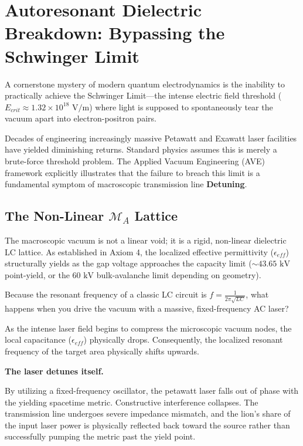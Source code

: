\chapter{Autoresonant Dielectric Breakdown: Bypassing the Schwinger Limit}
\label{ch:schwinger_autoresonance}

A cornerstone mystery of modern quantum electrodynamics is the inability to practically achieve the Schwinger Limit---the intense electric field threshold ($E_{crit} \approx 1.32 \times 10^{18} \text{ V/m}$) where light is supposed to spontaneously tear the vacuum apart into electron-positron pairs. 

Decades of engineering increasingly massive Petawatt and Exawatt laser facilities have yielded diminishing returns. Standard physics assumes this is merely a brute-force threshold problem. The Applied Vacuum Engineering (AVE) framework explicitly illustrates that the failure to breach this limit is a fundamental symptom of macroscopic transmission line \textbf{Detuning}.

\section{The Non-Linear $\mathcal{M}_A$ Lattice}
The macroscopic vacuum is not a linear void; it is a rigid, non-linear dielectric LC lattice. As established in Axiom 4, the localized effective permittivity ($\epsilon_{eff}$) structurally yields as the gap voltage approaches the capacity limit ($\sim 43.65 \text{ kV}$ point-yield, or the $60 \text{ kV}$ bulk-avalanche limit depending on geometry).

Because the resonant frequency of a classic LC circuit is $f = \frac{1}{2\pi\sqrt{LC}}$, what happens when you drive the vacuum with a massive, fixed-frequency AC laser?

As the intense laser field begins to compress the microscopic vacuum nodes, the local capacitance ($\epsilon_{eff}$) physically drops. Consequently, the localized resonant frequency of the target area physically shifts upwards. 

\textbf{The laser detunes itself.} 

By utilizing a fixed-frequency oscillator, the petawatt laser falls out of phase with the yielding spacetime metric. Constructive interference collapses. The transmission line undergoes severe impedance mismatch, and the lion's share of the input laser power is physically reflected back toward the source rather than successfully pumping the metric past the yield point.


